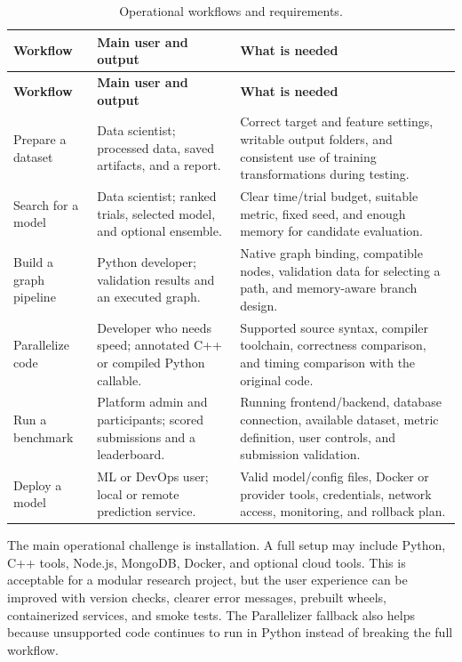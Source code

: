 \documentclass[12pt,a4paper]{report}
\newcommand{\acceleraTableStyle}{%
\small
\renewcommand{\arraystretch}{1.15}
\setlength{\tabcolsep}{4pt}%
}
\begin{document}
{\acceleraTableStyle
\begin{longtable}{p{} p{} p{}}
\caption{Operational workflows and requirements.}
\label{tab:operational-feasibility} \\
\toprule
\textbf{Workflow} & \textbf{Main user and output} &
\textbf{What is needed} \\
\midrule
\endfirsthead
\toprule
\textbf{Workflow} & \textbf{Main user and output} &
\textbf{What is needed} \\
\midrule
\endhead
\bottomrule
\endlastfoot
Prepare a dataset & Data scientist; processed data, saved artifacts, and a
report. & Correct target and feature settings, writable output folders, and
consistent use of training transformations during testing. \\
\hline
Search for a model & Data scientist; ranked trials, selected model, and
optional ensemble. & Clear time/trial budget, suitable metric, fixed seed, and
enough memory for candidate evaluation. \\
\hline
Build a graph pipeline & Python developer; validation results and an executed
graph. & Native graph binding, compatible nodes, validation data for selecting a
path, and memory-aware branch design. \\
\hline
Parallelize code & Developer who needs speed; annotated C++ or compiled Python
callable. & Supported source syntax, compiler toolchain, correctness comparison,
and timing comparison with the original code. \\
\hline
Run a benchmark & Platform admin and participants; scored submissions and a
leaderboard. & Running frontend/backend, database connection, available dataset,
metric definition, user controls, and submission validation. \\
\hline
Deploy a model & ML or DevOps user; local or remote prediction service. & Valid
model/config files, Docker or provider tools, credentials, network access,
monitoring, and rollback plan. \\
\end{longtable}
}

The main operational challenge is installation. A full setup may include Python,
C++ tools, Node.js, MongoDB, Docker, and optional cloud tools. This is acceptable
for a modular research project, but the user experience can be improved with
version checks, clearer error messages, prebuilt wheels, containerized services,
and smoke tests. The Parallelizer fallback also helps because unsupported code
continues to run in Python instead of breaking the full workflow.
\end{document}
